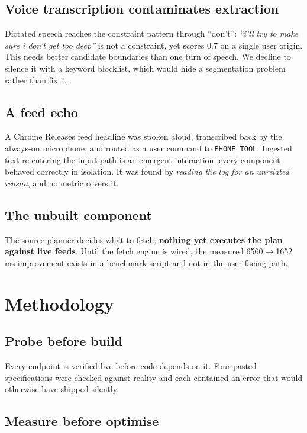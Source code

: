 \documentclass[10pt,twocolumn]{article}
\newcommand{\code}[1]{\texttt{\small #1}}
\begin{document}
\subsection{Voice transcription contaminates extraction}

Dictated speech reaches the constraint pattern through ``don't'': \emph{``i'll try to make
sure i don't get too deep''} is not a constraint, yet scores 0.7 on a single user origin.
This needs better candidate boundaries than one turn of speech. We decline to silence it
with a keyword blocklist, which would hide a segmentation problem rather than fix it.

\subsection{A feed echo}

A Chrome Releases feed headline was spoken aloud, transcribed back by the always-on
microphone, and routed as a user command to \code{PHONE\_TOOL}. Ingested text re-entering
the input path is an emergent interaction: every component behaved correctly in
isolation. It was found by \emph{reading the log for an unrelated reason}, and no metric
covers it.

\subsection{The unbuilt component}

The source planner decides what to fetch; \textbf{nothing yet executes the plan against
live feeds}. Until the fetch engine is wired, the measured 6560$\to$1652\,ms improvement
exists in a benchmark script and not in the user-facing path.

\section{Methodology}
\label{sec:method}

\subsection{Probe before build}

Every endpoint is verified live before code depends on it. Four pasted specifications
were checked against reality and each contained an error that would otherwise have
shipped silently.

\subsection{Measure before optimise}
\end{document}
